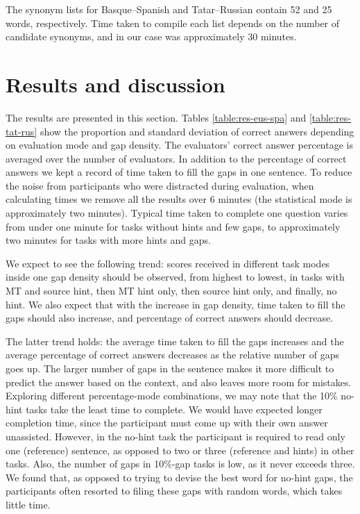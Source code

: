 \documentclass[11pt]{article}
\newcommand{\comment}[1]{\marginpar{\scriptsize\sf \textcolor{blue}{#1}}}
\begin{document}
The synonym lists for Basque--Spanish and Tatar--Russian contain 52 and 25 words, respectively. Time taken to compile each list depends on the number of candidate synonyms, and in our case was approximately 30 minutes. 

\section{Results and discussion}
\label{sec:results}

The results are presented in this section. Tables \ref{table:res-eus-spa} and \ref{table:res-tat-rus} show
the proportion and standard deviation of correct answers depending on evaluation mode and gap density.
The evaluators' correct answer percentage is averaged over the number of evaluators. In addition to the percentage of correct answers we kept a record of time taken to fill the gaps in one sentence. To reduce the noise from participants who were distracted during evaluation, when
calculating times we remove all the results over 6 minutes (the statistical mode is approximately
two minutes). Typical time taken to complete one question varies from under one minute for tasks without hints and few gaps, to approximately two minutes for tasks with more hints and gaps. 

We expect to see the following trend: scores received in different task modes inside one gap density should be observed, from highest to lowest, in tasks with MT and source hint, then MT hint only, then source hint only, and finally, no hint. We also expect that with the increase in gap density, time taken to fill the gaps should also increase, and percentage of correct answers should decrease. 

The latter trend holds: the average time taken to fill the gaps increases and the average percentage of correct answers decreases as the relative number of gaps goes up. The larger number of gaps in the sentence makes it more
difficult to predict the answer based on the context, and also leaves more room for
mistakes. Exploring different percentage-mode combinations, we may note that the 10\% no-hint tasks take the least time to complete. We would have expected longer completion time, since the participant must come up with their own answer unassisted. However, in the no-hint task the participant is required to read only one (reference) sentence, as opposed to two or three (reference and hints) in other tasks. Also, the number of gaps in 10\%-gap tasks is low, as it never exceeds three. We found that, as opposed to trying to devise the best word for no-hint gaps, the participants often resorted to filing these gaps with random words, which takes little time.
\end{document}
